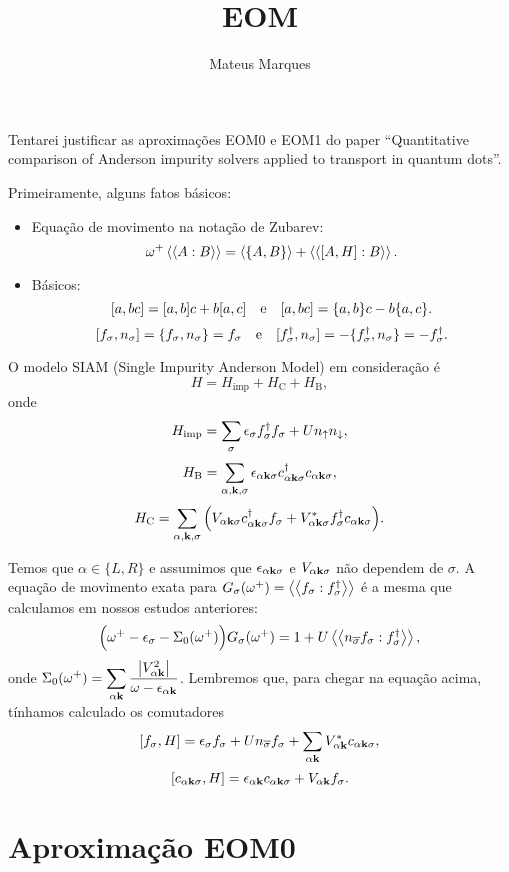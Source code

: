 \documentclass[a4paper,fleqn,12pt]{article}
\title{\Huge{\textbf{EOM}}}
\author{Mateus Marques}
\begin{document}
\maketitle

Tentarei justificar as aproximações EOM0 e EOM1 do paper ``Quantitative comparison of Anderson impurity solvers applied to transport in quantum dots''.

\n

Primeiramente, alguns fatos básicos:
\begin{itemize}
\item Equação de movimento na notação de Zubarev:
$$
\omega^+ \gf{A}{B} = \ev{\{ A, B\}} + \gf{[A, H]}{B}.
$$
\item Básicos:
$$
[a, bc] = [a, b] c + b [a, c] \quad \mathrm{e} \quad [a, bc] = \{a, b\} c - b \{a, c\}.
$$
$$
[f_\sigma, n_{\sigma}] = \{f_\sigma, n_{\sigma}\} = f_\sigma \quad \mathrm{e} \quad
[f_\sigma^\dagger, n_{\sigma}] = -\{f_\sigma^\dagger, n_{\sigma}\}
= - f_\sigma^\dagger.
$$
\end{itemize}


O modelo SIAM (Single Impurity Anderson Model) em consideração é
$$
H = H_{\text{imp}} + H_{\text{C}} + H_{\text{B}},
$$
onde
$$
H_{\text{imp}} = \sum_\sigma \epsilon_\sigma f_\sigma^\dagger f_\sigma +
U n_\uparrow n_\downarrow,
$$
$$
H_{\text{B}} = \sum_{\alpha, \vb{k}, \sigma} \epsilon_{\alpha \vb{k} \sigma}
c_{\alpha \vb{k} \sigma}^\dagger c_{\alpha \vb{k} \sigma},
$$
$$
H_{\text{C}} = \sum_{\alpha, \vb{k}, \sigma} \Big(
V_{\alpha \vb{k} \sigma} c^\dagger_{\alpha \vb{k} \sigma} f_\sigma +
V_{\alpha \vb{k} \sigma}^* f^\dagger_\sigma  c_{\alpha \vb{k} \sigma}
\Big).
$$

Temos que $\alpha \in \{L, R\}$ e assumimos que $\epsilon_{\alpha \vb{k} \sigma}$ e $V_{\alpha \vb{k} \sigma}$ não dependem de $\sigma$. A equação de movimento exata para $G_\sigma(\omega^+) = \gf{f_\sigma}{f_\sigma^\dagger}$ é a mesma que calculamos em nossos estudos anteriores:
$$
\Big(
\omega^+ - \eps_\sigma - \Sigma_0(\omega^+)
\Big) G_\sigma(\omega^+)
= 1 + U \gf{n_{\cc{\sigma}} f_\sigma}{f_\sigma^\dagger},
$$
onde $\displaystyle{\Sigma_0(\omega^+) = \sum_{\alpha \vb{k}} \frac{\abs{V_{\alpha \vb{k}}^2}}{\omega - \epsilon_{\alpha \vb{k}}}}$. Lembremos que, para chegar na equação acima, tínhamos calculado os comutadores
$$
[f_\sigma, H] = \epsilon_\sigma  f_\sigma + U n_{\overline{\sigma}} f_\sigma +
\sum_{\alpha \vb{k}} V_{\alpha \vb{k}}^* c_{\alpha \vb{k} \sigma},
$$
$$
[c_{\alpha \vb{k} \sigma}, H] = \epsilon_{\alpha \vb{k}} c_{\alpha \vb{k} \sigma} +
V_{\alpha \vb{k}} f_\sigma.
$$


\section{Aproximação EOM0}
\end{document}
